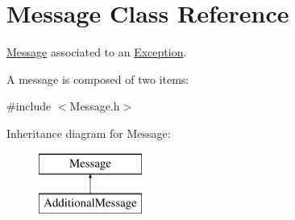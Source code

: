 \hypertarget{class_message}{\section{Message Class Reference}
\label{class_message}
}


\hyperlink{class_message}{Message} associated to an \hyperlink{class_exception}{Exception}.

A message is composed of two items\-:  




{\ttfamily \#include $<$Message.\-h$>$}

Inheritance diagram for Message\-:\begin{figure}[H]
\begin{center}
\leavevmode
\includegraphics[height=2.000000cm]{class_message}
\end{center}
\end{figure}

